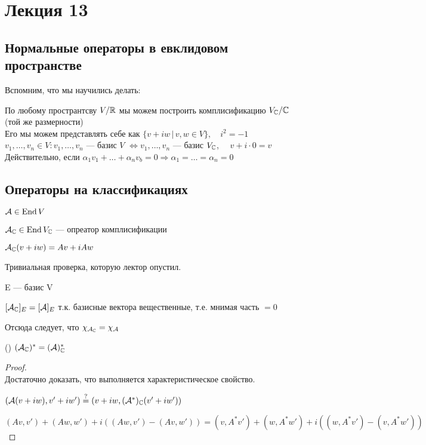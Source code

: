 \section{Лекция 13}

\subsection{Нормальные операторы в евклидовом пространстве}

Вспомним, что мы научились делать:

    По любому пространтсву $V / \mathbb{R}$ мы можем построить комплисификацию $V_{\mathbb{C}} / \mathbb{C}$ (той же размерности) \\
    Его мы можем представлять себе как $ \{ v + iw \, | \, v,w \in V \}, \quad i^2 = -1 $ \\
    $v_1, \dots, v_n \in V: v_1, \dots, v_n$ --- базис $V$ $\Longleftrightarrow v_1, \dots, v_n$ --- базис $V_{\mathbb{C}}$, $\quad v + i \cdot 0 = v$
    Действительно, если $\alpha_1 v_1 + \dots + \alpha_n v_b = 0 \Longrightarrow \alpha_1 = \dots = \alpha_n = 0$
    

\subsection{Операторы на классификациях}

\begin{conj}
$ \mathcal{A} \in \operatorname{End}{V} $

$ \mathcal{A}_{\mathbb{C}} \in \operatorname{End}{V_{\mathbb{C}}}  $ --- опреатор комплисификации

$ \mathcal{A}_{\mathbb{C}}(v + iw) = Av + iAw $

Тривиальная проверка, которую лектор опустил.
\end{conj}

\begin{conj}
E --- базис V

$[\mathcal{A}_{\mathbb{C}}]_{E} = [\mathcal{A}]_{E}$ т.к. базисные вектора вещественные, т.е. мнимая часть $ = 0$

Отсюда следует, что $\chi_{\mathcal{A}_{\mathbb{C}}} = \chi_{\mathcal{A}}$
\end{conj}

\begin{theorem}() %
    $ (\mathcal{A}_{\mathbb{C}})^* = (\mathcal{A})^*_{\mathbb{C}} $

    \begin{proof}
    $ $ \\
    Достаточно доказать, что выполняется характеристическое свойство.

    $(\mathcal{A}(v + iw), v' + iw') \stackrel{?}{=} (v + iw, (\mathcal{A}^*)_{\mathbb{C}}(v' + iw'))$

    $(A v, v') + (A w, w') + i ((A w, v') - (A v, w')) = (v, A^* v') + (w, A^* w') + i ( (w, A^* v') - (v, A^* w') )$ 
    \end{proof}
\end{theorem}


